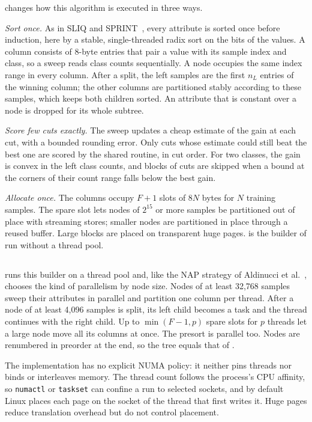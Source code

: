 \ImplSerialOpt{} changes how this algorithm is executed in three ways.

\emph{Sort once.} As in SLIQ and SPRINT~\cite{mehta1996sliq,shafer1996sprint}, every attribute is sorted once before induction, here by a stable, single-threaded radix sort on the bits of the values. A column consists of 8-byte entries that pair a value with its sample index and class, so a sweep reads class counts sequentially. A node occupies the same index range in every column. After a split, the left samples are the first $n_L$ entries of the winning column; the other columns are partitioned stably according to these samples, which keeps both children sorted. An attribute that is constant over a node is dropped for its whole subtree.

\emph{Score few cuts exactly.} The sweep updates a cheap estimate of the gain at each cut, with a bounded rounding error. Only cuts whose estimate could still beat the best one are scored by the shared routine, in cut order. For two classes, the gain is convex in the left class counts, and blocks of cuts are skipped when a bound at the corners of their count range falls below the best gain.

\emph{Allocate once.} The columns occupy $F+1$ slots of $8N$ bytes for $N$ training samples. The spare slot lets nodes of $2^{15}$ or more samples be partitioned out of place with streaming stores; smaller nodes are partitioned in place through a reused buffer. Large blocks are placed on transparent huge pages. \ImplSerialOpt{} is the builder of \ImplParallel{} run without a thread pool.

\subsection{\ImplParallel}
\label{sec:impl-parallel}

\ImplParallel{} runs this builder on a thread pool and, like the NAP strategy of Aldinucci et al.~\cite{aldinucci2014fastflow}, chooses the kind of parallelism by node size. Nodes of at least 32,768 samples sweep their attributes in parallel and partition one column per thread. After a node of at least 4,096 samples is split, its left child becomes a task and the thread continues with the right child. Up to $\min(F-1, p)$ spare slots for $p$ threads let a large node move all its columns at once. The presort is parallel too. Nodes are renumbered in preorder at the end, so the tree equals that of \ImplSerialOpt{}.

The implementation has no explicit NUMA policy: it neither pins threads nor binds or interleaves memory. The thread count follows the process's CPU affinity, so \texttt{numactl} or \texttt{taskset} can confine a run to selected sockets, and by default Linux places each page on the socket of the thread that first writes it. Huge pages reduce translation overhead but do not control placement.

